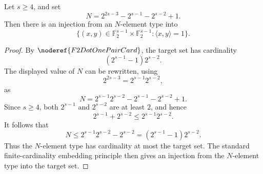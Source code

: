 \begin{helper}
Let \(s\ge4\), and set
\[
  N=2^{2s-3}-2^{s-1}-2^{s-2}+1.
\]
Then there is an injection from an \(N\)-element type into
\[
  \{(x,y)\in\mathbb F_2^{s-1}\times\mathbb F_2^{s-1}:
    \langle x,y\rangle=1\}.
\]
\end{helper}
\begin{proof}
By \(\noderef{F2DotOnePairCard}\), the target set has cardinality
\[
  (2^{s-1}-1)2^{s-2}.
\]
The displayed value of \(N\) can be rewritten, using
\[
  2^{2s-3}=2^{s-1}2^{s-2},
\]
as
\[
  N=2^{s-1}2^{s-2}-2^{s-1}-2^{s-2}+1.
\]
Since \(s\ge4\), both \(2^{s-1}\) and \(2^{s-2}\) are at least \(2\), and hence
\[
  2^{s-1}+2^{s-2}\le 2^{s-1}2^{s-2}.
\]
It follows that
\[
  N\le 2^{s-1}2^{s-2}-2^{s-2}
    =(2^{s-1}-1)2^{s-2}.
\]
Thus the \(N\)-element type has cardinality at most the target set. The standard
finite-cardinality embedding principle then gives an injection from the
\(N\)-element type into the target set.
\end{proof}
